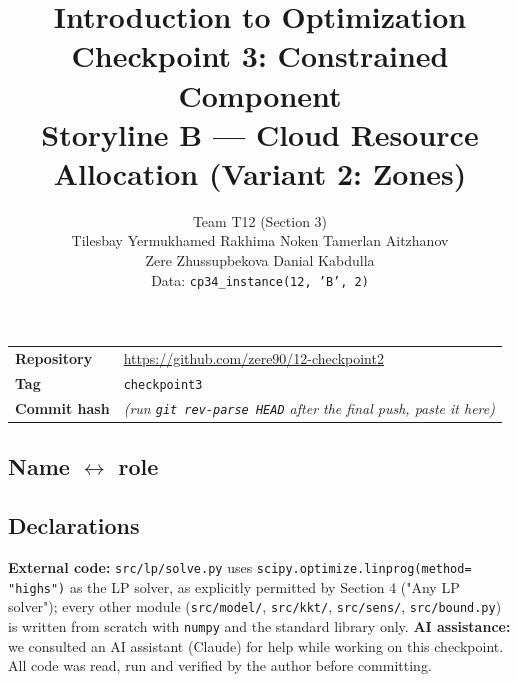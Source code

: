 \documentclass[11pt]{article}
\title{\textbf{Introduction to Optimization}\\[2pt]
Checkpoint 3: Constrained Component\\
Storyline B --- Cloud Resource Allocation (Variant 2: Zones)}
\author{Team T12 (Section 3)\\[4pt]
\small Tilesbay Yermukhamed \quad Rakhima Noken \quad Tamerlan Aitzhanov\\
\small Zere Zhussupbekova \quad Danial Kabdulla\\[6pt]
\normalsize Data: \texttt{cp34\_instance(12, 'B', 2)}}
\date{}
\begin{document}
\maketitle
\vspace{-20pt}

\begin{center}
\renewcommand{\arraystretch}{1.2}
\begin{tabular}{@{}ll@{}}
\toprule
\textbf{Repository} & \url{https://github.com/zere90/12-checkpoint2} \\
\textbf{Tag} & \texttt{checkpoint3} \\
\textbf{Commit hash} & \textit{(run \texttt{git rev-parse HEAD} after the final push, paste it here)} \\
\bottomrule
\end{tabular}
\end{center}

\subsection*{Name $\leftrightarrow$ role}
\begin{center}
\renewcommand{\arraystretch}{1.25}
\end{center}

\subsection*{Declarations}
\textbf{External code:} \texttt{src/lp/solve.py} uses \texttt{scipy.optimize.linprog(method=}
\texttt{"highs")} as the LP solver, as explicitly permitted by Section 4 ("Any LP solver"); every
other module (\texttt{src/model/}, \texttt{src/kkt/}, \texttt{src/sens/}, \texttt{src/bound.py}) is
written from scratch with \texttt{numpy} and the standard library only. \textbf{AI assistance:} we
consulted an AI assistant (Claude) for help while working on this checkpoint. All code was read,
run and verified by the author before committing.
\end{document}

